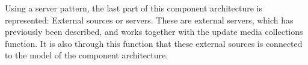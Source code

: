 Using a server pattern, the last part of this component architecture is represented: External sources or servers. These are external servers, which has previously been described, and works together with the update media collections function. It is also through this function that these external sources is connected to the model of the component architecture.